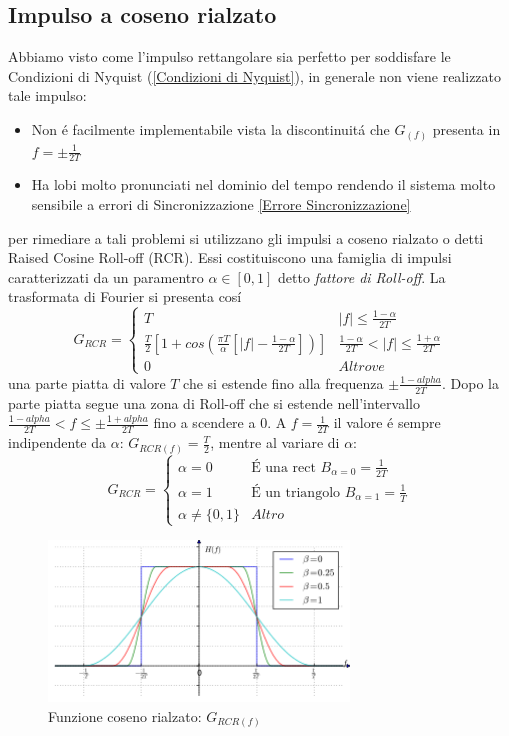     \subsection{Impulso a coseno rialzato}
        Abbiamo visto come l'impulso rettangolare sia perfetto per soddisfare le Condizioni di Nyquist (\ref*{Condizioni di Nyquist}),
        in generale non viene realizzato tale impulso:
        \begin{itemize}
            \item {Non é facilmente implementabile vista la discontinuitá che $G_{(f)}$ presenta in $f=\pm \frac{1}{2T}$}
            \item {Ha lobi molto pronunciati nel dominio del tempo rendendo il sistema molto sensibile a errori di Sincronizzazione \ref{Errore Sincronizzazione}}
        \end{itemize}
        per rimediare a tali problemi si utilizzano gli impulsi a coseno rialzato o detti Raised Cosine Roll-off (RCR). Essi 
        costituiscono una famiglia di impulsi caratterizzati da un paramentro $\alpha\in [0,1]$ detto \emph{fattore di Roll-off}.
        La trasformata di Fourier si presenta cosí 
        \[
            G_{RCR} = 
            \begin{cases}
                T &|f| \leq \frac{1-\alpha}{2T}\nonumber \\
                \frac{T}{2} \left[1+cos\left(\frac{\pi T}{\alpha}\left[|f| - \frac{1-\alpha}{2T}\right]\right)\right] &\frac{1-\alpha}{2T}<|f|\leq \frac{1+\alpha}{2T}\nonumber \\
                0 &Altrove\nonumber
            \end{cases}    
        \]
        una parte piatta di valore $T$ che si estende fino alla frequenza $\pm \frac{1-alpha}{2T}$. Dopo la parte piatta
        segue una zona di Roll-off che si estende nell'intervallo $\frac{1-alpha}{2T}< f \leq \pm \frac{1+alpha}{2T}$ fino a scendere 
        a $0$. A $f=\frac{1}{2T}$ il valore é sempre indipendente da $\alpha$: $G_{RCR(f)} = \frac{T}{2}$, mentre al variare di $\alpha$:
        \[
            G_{RCR} = 
            \begin{cases}
                \alpha = 0 &\text{É una rect } B_{\alpha=0}=\frac{1}{2T} \nonumber\\
                \alpha=1 &\text{É un triangolo } B_{\alpha=1}=\frac{1}{T}\nonumber\\
                \alpha\neq \{0,1\} & Altro\nonumber
            \end{cases}
        \]
        \begin{figure}[H]
            \centering
            \includegraphics[width = 8cm]{media/Hf-Raised-cosine_filter.png}
            \caption{Funzione coseno rialzato: $G_{RCR(f)}$}
        \end{figure}

